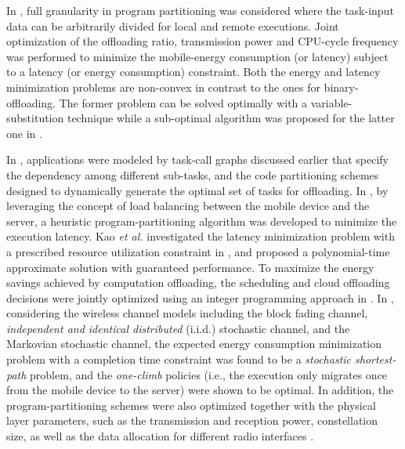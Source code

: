 \documentclass[journal]{IEEEtran}
\begin{document}
In \cite{YWangTCOM16}, full granularity in program  partitioning  was considered where the task-input data can be arbitrarily divided for local and remote executions. Joint optimization of the offloading ratio, transmission  power and CPU-cycle frequency was performed  to minimize the mobile-energy consumption (or latency) subject to a latency (or energy consumption) constraint. Both the energy  and latency minimization problems are non-convex in contrast to the ones for binary-offloading.  The former problem can be  solved optimally with a variable-substitution technique while a sub-optimal algorithm was proposed for the latter one in \cite{YWangTCOM16}.

In \cite{MJiaINFOCOMWS1404,MahmoodiTCC16,KaoINFOCOM1504,WZhangTWC1501,Khalili1508,PLorenzo1603,MahmoodiICC1506}, applications were modeled by task-call graphs discussed earlier  that specify the dependency among different sub-tasks, and the code partitioning schemes   designed to dynamically generate the optimal set of tasks for offloading. In \cite{MJiaINFOCOMWS1404}, by leveraging the concept of load balancing between the mobile device and the server, a heuristic program-partitioning algorithm was developed to minimize the execution latency. Kao \emph{et al.} investigated the latency minimization problem with a prescribed resource utilization constraint in \cite{KaoINFOCOM1504}, and proposed a polynomial-time approximate solution with guaranteed performance. To maximize the energy savings achieved by computation offloading, the scheduling and cloud offloading decisions were jointly optimized using an integer programming approach in \cite{MahmoodiTCC16}. In \cite{WZhangTWC1501}, considering the wireless channel models including the block fading channel, \emph{independent and identical distributed} (i.i.d.) stochastic channel, and the Markovian stochastic channel, the expected energy consumption minimization problem with a completion time constraint was found to be a \emph{stochastic shortest-path} problem, and the \emph{one-climb} policies (i.e., the execution only migrates once from the mobile device to the server) were shown to be optimal. In addition, the program-partitioning schemes were also optimized together with the physical layer parameters, such as the transmission and reception power, constellation size, as well as the data allocation for different radio interfaces \cite{Khalili1508,PLorenzo1603,MahmoodiICC1506}.
\end{document}
